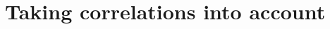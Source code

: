 \documentclass[12pt,a4paper]{report}
\begin{document}
%		
%		
%	
%		
	
			
	\section{Taking correlations into account}		%
\end{document}
